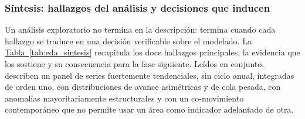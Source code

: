 \documentclass[12pt,letterpaper]{report}
\begin{document}
\subsubsection{Síntesis: hallazgos del análisis y decisiones que inducen}

Un análisis exploratorio no termina en la descripción: termina cuando cada hallazgo se
traduce en una decisión verificable sobre el modelado. La \hyperref[tab:eda_sintesis]{Tabla~\ref*{tab:eda_sintesis}}
recapitula los doce hallazgos principales, la evidencia que los sostiene y su consecuencia para la
fase siguiente. Leídos en conjunto, describen un panel de series fuertemente tendenciales, sin
ciclo anual, integradas de orden uno, con distribuciones de avance asimétricas y de cola pesada,
con anomalías mayoritariamente estructurales y con un co-movimiento contemporáneo que no permite
usar un área como indicador adelantado de otra.
\end{document}
